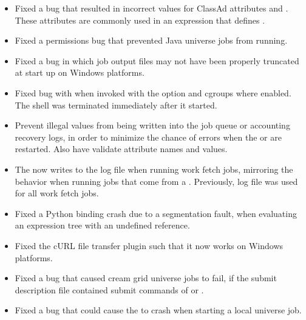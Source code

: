 \begin{itemize}

\item Fixed a bug that resulted in incorrect values for ClassAd attributes
 and .
These attributes are commonly used in an expression that defines
.

\item Fixed a permissions bug that prevented Java universe jobs
from running.

\item Fixed a bug in which job output files may not have been properly truncated
at start up on Windows platforms. 

\item Fixed bug with  
when invoked with the  option and cgroups where enabled.
The shell was terminated immediately after it started.

\item Prevent illegal values from being written into the job queue
or accounting recovery logs, in order to minimize the chance of errors when
the  or  are restarted. Also
have  validate attribute names and values.

\item The  now writes to the log file
 when running work fetch jobs, mirroring the
behavior when running jobs that come from a .
Previously, log file  was used for all work fetch
jobs.

\item Fixed a Python binding crash due to a segmentation fault, when evaluating an expression tree with an undefined reference.

\item Fixed the cURL file transfer plugin such that it now works
on Windows platforms.

\item Fixed a bug that caused cream grid universe jobs to fail, 
if the submit description file contained 
submit commands of  or .

\item Fixed a bug that could cause the  to crash when
starting a local universe job.


\end{itemize}
